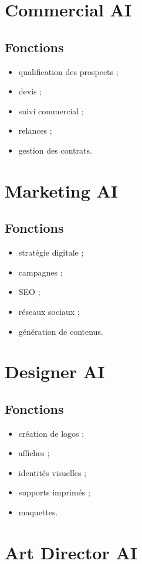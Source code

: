 \documentclass[12pt,a4paper,oneside]{book}
\begin{document}
\section{Commercial AI}
\subsection{Fonctions}
\begin{itemize}
\item qualification des prospects ;
\item devis ;
\item suivi commercial ;
\item relances ;
\item gestion des contrats.
\end{itemize}

\section{Marketing AI}
\subsection{Fonctions}
\begin{itemize}
\item stratégie digitale ;
\item campagnes ;
\item SEO ;
\item réseaux sociaux ;
\item génération de contenus.
\end{itemize}

\section{Designer AI}
\subsection{Fonctions}
\begin{itemize}
\item création de logos ;
\item affiches ;
\item identités visuelles ;
\item supports imprimés ;
\item maquettes.
\end{itemize}

\section{Art Director AI}
\end{document}
